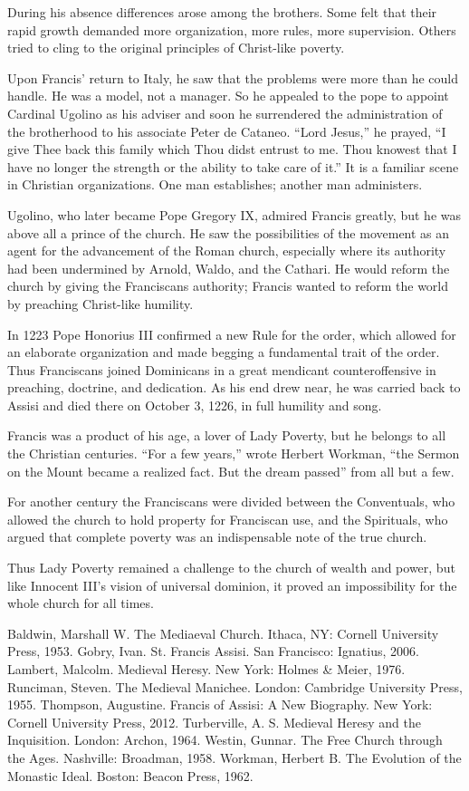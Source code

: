 During his absence differences arose among the brothers. Some felt that their rapid growth demanded
more organization, more rules, more supervision. Others tried to cling to the original principles of
Christ-like poverty.

Upon Francis’ return to Italy, he saw that the problems were more than he could handle. He was a
model, not a manager. So he appealed to the pope to appoint Cardinal Ugolino as his adviser and soon
he surrendered the administration of the brotherhood to his associate Peter de Cataneo. “Lord
Jesus,” he prayed, “I give Thee back this family which Thou didst entrust to me. Thou knowest that I
have no longer the strength or the ability to take care of it.” It is a familiar scene in Christian
organizations. One man establishes; another man administers.

Ugolino, who later became Pope Gregory IX, admired Francis greatly, but he was above all a prince of
the church. He saw the possibilities of the movement as an agent for the advancement of the Roman
church, especially where its authority had been undermined by Arnold, Waldo, and the Cathari. He
would reform the church by giving the Franciscans authority; Francis wanted to reform the world by
preaching Christ-like humility.

In 1223 Pope Honorius III confirmed a new Rule for the order, which allowed for an elaborate
organization and made begging a fundamental trait of the order. Thus Franciscans joined Dominicans
in a great mendicant counteroffensive in preaching, doctrine, and dedication. As his end drew near,
he was carried back to Assisi and died there on October 3, 1226, in full humility and song.

Francis was a product of his age, a lover of Lady Poverty, but he belongs to all the Christian
centuries. “For a few years,” wrote Herbert Workman, “the Sermon on the Mount became a realized
fact. But the dream passed” from all but a few.

For another century the Franciscans were divided between the Conventuals, who allowed the church to
hold property for Franciscan use, and the Spirituals, who argued that complete poverty was an
indispensable note of the true church.

Thus Lady Poverty remained a challenge to the church of wealth and power, but like Innocent III’s
vision of universal dominion, it proved an impossibility for the whole church for all times.

\begin{readinglist}
\entry Baldwin, Marshall W. The Mediaeval Church. Ithaca, NY: Cornell University Press, 1953.
\entry Gobry, Ivan. St. Francis Assisi. San Francisco: Ignatius, 2006.
\entry Lambert, Malcolm. Medieval Heresy. New York: Holmes \& Meier, 1976.
\entry Runciman, Steven. The Medieval Manichee. London: Cambridge University Press, 1955.
\entry Thompson, Augustine. Francis of Assisi: A New Biography. New York: Cornell University Press,
  2012.
\entry Turberville, A. S. Medieval Heresy and the Inquisition. London: Archon, 1964.
\entry Westin, Gunnar. The Free Church through the Ages. Nashville: Broadman, 1958.
\entry Workman, Herbert B. The Evolution of the Monastic Ideal. Boston: Beacon Press, 1962.
\end{readinglist}
